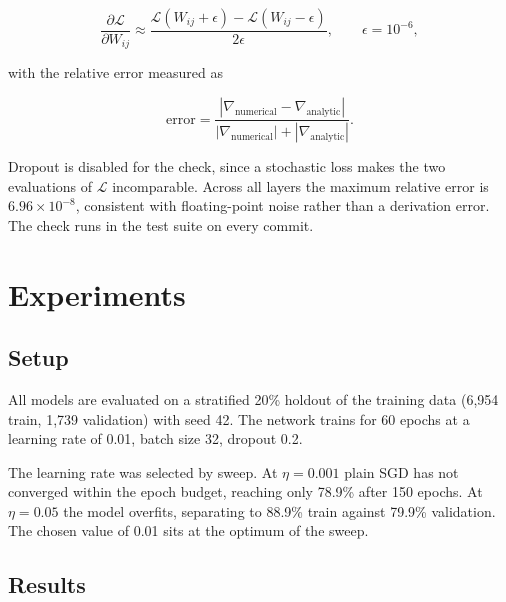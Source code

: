 \documentclass[11pt,a4paper]{article}
\begin{document}
\begin{equation}
\frac{\partial \mathcal{L}}{\partial W_{ij}} \approx
\frac{\mathcal{L}(W_{ij}+\epsilon) - \mathcal{L}(W_{ij}-\epsilon)}{2\epsilon},
\qquad \epsilon = 10^{-6},
\end{equation}

with the relative error measured as

\begin{equation}
\text{error} = \frac{\left|\nabla_{\text{numerical}} - \nabla_{\text{analytic}}\right|}
{\left|\nabla_{\text{numerical}}\right| + \left|\nabla_{\text{analytic}}\right|}.
\end{equation}

Dropout is disabled for the check, since a stochastic loss makes the two
evaluations of $\mathcal{L}$ incomparable. Across all layers the maximum relative
error is $6.96\times10^{-8}$, consistent with floating-point noise rather than a
derivation error. The check runs in the test suite on every commit.

\section{Experiments}

\subsection{Setup}

All models are evaluated on a stratified 20\% holdout of the training data
(6{,}954 train, 1{,}739 validation) with seed 42. The network trains for 60
epochs at a learning rate of 0.01, batch size 32, dropout 0.2.

The learning rate was selected by sweep. At $\eta = 0.001$ plain SGD has not
converged within the epoch budget, reaching only 78.9\% after 150 epochs. At
$\eta = 0.05$ the model overfits, separating to 88.9\% train against 79.9\%
validation. The chosen value of 0.01 sits at the optimum of the sweep.

\subsection{Results}
\end{document}
